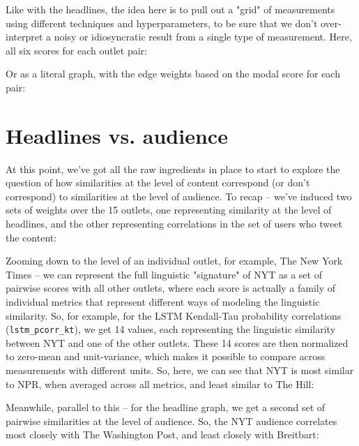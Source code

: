 \documentclass{scrartcl}
\begin{document}

Like with the headlines, the idea here is to pull out a "grid" of measurements using different techniques and hyperparameters, to be sure that we don't over-interpret a noisy or idiosyncratic result from a single type of measurement. Here, all six scores for each outlet pair:


Or as a literal graph, with the edge weights based on the modal score for each pair:


\section{Headlines vs. audience}

At this point, we've got all the raw ingredients in place to start to explore the question of how similarities at the level of content correspond (or don't correspond) to similarities at the level of audience. To recap -- we've induced two sets of weights over the 15 outlets, one representing similarity at the level of headlines, and the other representing correlations in the set of users who tweet the content:



Zooming down to the level of an individual outlet, for example, The New York Times -- we can represent the full linguistic "signature" of NYT as a set of pairwise scores with all other outlets, where each score is actually a family of individual metrics that represent different ways of modeling the linguistic similarity. So, for example, for the LSTM Kendall-Tau probability correlations (\texttt{lstm\_pcorr\_kt}), we get 14 values, each representing the linguistic similarity between NYT and one of the other outlets. These 14 scores are then normalized to zero-mean and unit-variance, which makes it possible to compare across measurements with different units. So, here, we can see that NYT is most similar to NPR, when averaged across all metrics, and least similar to The Hill:


Meanwhile, parallel to this -- for the headline graph, we get a second set of pairwise similarities at the level of audience. So, the NYT audience correlates most closely with The Washington Post, and least closely with Breitbart:
\end{document}
